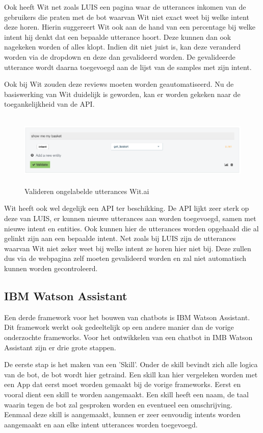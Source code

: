 Ook heeft Wit net zoals LUIS een pagina waar de utterances inkomen van de gebruikers die praten met de bot waarvan Wit niet exact weet bij welke intent deze horen. Hierin suggereert Wit ook aan de hand van een percentage bij welke intent hij denkt dat een bepaalde utterance hoort. Deze kunnen dan ook nagekeken worden of alles klopt. Indien dit niet juist is, kan deze veranderd worden via de dropdown en deze dan gevalideerd worden. De gevalideerde utterance wordt daarna toegevoegd aan de lijst van de samples met zijn intent.

Ook bij Wit zouden deze reviews moeten worden geautomatiseerd. Nu de basiswerking van Wit duidelijk is geworden, kan er worden gekeken naar de toegankelijkheid van de API. 

\begin{figure}[h!]
	\centering
	\includegraphics[height=3.5cm]{img/inbox.png}
	\caption{Valideren ongelabelde utterances Wit.ai}
	\label{fig:inbox}
\end{figure}

Wit heeft ook wel degelijk een API ter beschikking. De API lijkt zeer sterk op deze van LUIS, er kunnen nieuwe utterances aan worden toegevoegd, samen met nieuwe intent en entities. Ook kunnen hier de utterances worden opgehaald die al gelinkt zijn aan een bepaalde intent. Net zoals bij LUIS zijn de utterances waarvan Wit niet zeker weet bij welke intent ze horen hier niet bij. Deze zullen dus via de webpagina zelf moeten gevalideerd worden en zal niet automatisch kunnen worden gecontroleerd.

\subsection{IBM Watson Assistant}
\label{watson}

Een derde framework voor het bouwen van chatbots is IBM Watson Assistant. Dit framework werkt ook gedeeltelijk op een andere manier dan de vorige onderzochte frameworks. Voor het ontwikkelen van een chatbot in IMB Watson Assistant zijn er drie grote stappen.

De eerste stap is het maken van een 'Skill'. Onder de skill bevindt zich alle logica van de bot, de bot wordt hier getraind. Een skill kan hier vergeleken worden met een App dat eerst moet worden gemaakt bij de vorige frameworks. Eerst en vooral dient een skill te worden aangemaakt. Een skill heeft een naam, de taal waarin tegen de bot zal gesproken worden en eventueel een omschrijving. Eenmaal deze skill is aangemaakt, kunnen er zeer eenvoudig intents worden aangemaakt en aan elke intent utterances worden toegevoegd.

